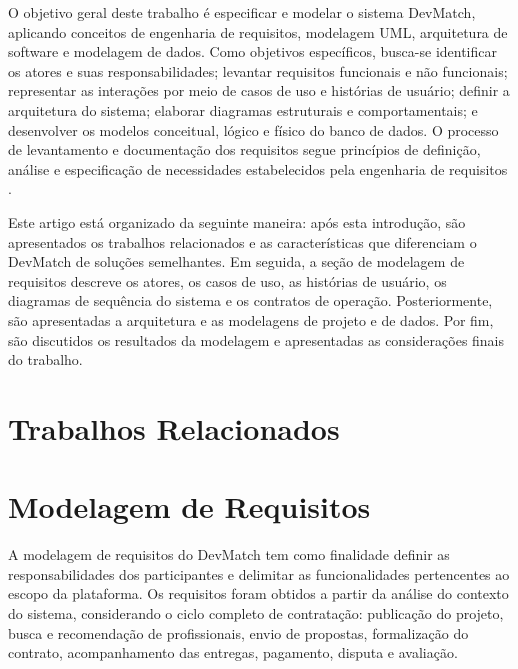 \documentclass[portuguese]{sbcreviews-2025}
\begin{document}
O objetivo geral deste trabalho é especificar e modelar o sistema
DevMatch, aplicando conceitos de engenharia de requisitos, modelagem
UML, arquitetura de software e modelagem de dados. Como objetivos
específicos, busca-se identificar os atores e suas
responsabilidades; levantar requisitos funcionais e não funcionais;
representar as interações por meio de casos de uso e histórias de
usuário; definir a arquitetura do sistema; elaborar diagramas
estruturais e comportamentais; e desenvolver os modelos conceitual,
lógico e físico do banco de dados. O processo de levantamento e
documentação dos requisitos segue princípios de definição, análise
e especificação de necessidades estabelecidos pela engenharia de
requisitos \citep{iso29148}.

Este artigo está organizado da seguinte maneira: após esta introdução,
são apresentados os trabalhos relacionados e as características que
diferenciam o DevMatch de soluções semelhantes. Em seguida, a seção
de modelagem de requisitos descreve os atores, os casos de uso, as
histórias de usuário, os diagramas de sequência do sistema e os
contratos de operação. Posteriormente, são apresentadas a arquitetura
e as modelagens de projeto e de dados. Por fim, são discutidos os
resultados da modelagem e apresentadas as considerações finais do
trabalho.


\section{Trabalhos Relacionados}
\label{sec:trabalhos-relacionados}



\section{Modelagem de Requisitos}
\label{sec:requisitos}

A modelagem de requisitos do DevMatch tem como finalidade definir as
responsabilidades dos participantes e delimitar as funcionalidades
pertencentes ao escopo da plataforma. Os requisitos foram obtidos a
partir da análise do contexto do sistema, considerando o ciclo
completo de contratação: publicação do projeto, busca e recomendação
de profissionais, envio de propostas, formalização do contrato,
acompanhamento das entregas, pagamento, disputa e avaliação.
\end{document}
